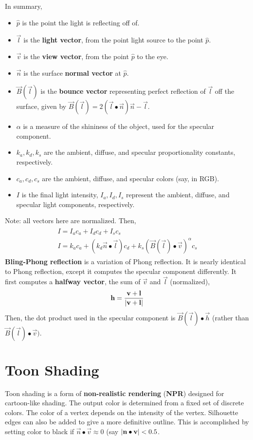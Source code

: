 \documentclass[letterpaper,12pt]{article}
\begin{document}
In summary,
\begin{itemize}
    \item $\hat{p}$ is the point the light is reflecting off of.
    \item $\vec{l}$ is the \textbf{light vector}, from the point light source to the point $\hat{p}$.
    \item $\vec{v}$ is the \textbf{view vector}, from the point $\hat{p}$ to the eye.
    \item $\vec{n}$ is the surface \textbf{normal vector} at $\hat{p}$.
    \item $\vec{B}(\vec{l})$ is the \textbf{bounce vector} representing perfect reflection of $\vec{l}$ off the surface, given by $\vec{B}(\vec{l}) = 2(\vec{l} \bullet \vec{n}) \vec{n} - \vec{l}$.
    \item $\alpha$ is a measure of the shininess of the object, used for the specular component.
    \item $k_a, k_d, k_s$ are the ambient, diffuse, and specular proportionality constants, respectively.
    \item $c_a, c_d, c_s$ are the ambient, diffuse, and specular colors (say, in RGB).
    \item $I$ is the final light intensity, $I_a, I_d, I_s$ represent the ambient, diffuse, and specular light components, respectively.
\end{itemize}
Note: all vectors here are normalized. Then,
\begin{align*}
    \boxed{\begin{array}{ll}
        I = I_a c_a + I_d c_d + I_s c_s \\
        I = k_a c_a + (k_d \vec{n} \bullet \vec{l}) c_d + k_s (\vec{B}(\vec{l}) \bullet \vec{v})^{\alpha} c_s
    \end{array}}
\end{align*}
\textbf{Bling-Phong reflection} is a variation of Phong reflection. It is nearly identical to Phong reflection, except it computes the specular component differently. It first computes a \textbf{halfway vector}, the sum of $\vec{v}$ and $\vec{l}$ (normalized),
\begin{equation*}
    \mathbf{h} = \frac{\mathbf{v} + \mathbf{l}}{\left\lvert \mathbf{v} + \mathbf{l} \right\rvert}
\end{equation*}
Then, the dot product used in the specular component is $\vec{B}(\vec{l}) \bullet \vec{h}$ (rather than $\vec{B}(\vec{l}) \bullet \vec{v})$.

\section*{Toon Shading}
Toon shading is a form of \textbf{non-realistic rendering} (\textbf{NPR}) designed for cartoon-like shading. The output color is determined from a fixed set of discrete colors. The color of a vertex depends on the intensity of the vertex. Silhouette edges can also be added to give a more definitive outline. This is accomplished by setting color to black if $\vec{n} \bullet \vec{v} \approx 0$ (say $\left\lvert \mathbf{n} \bullet \mathbf{v} \right\rvert < 0.5$.
\end{document}
